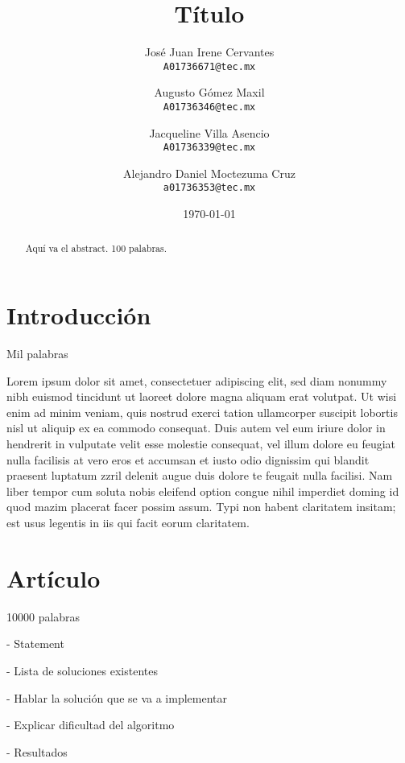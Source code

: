\documentclass[]{article}
\title{Título}
\author{
	José Juan Irene Cervantes \\
	\texttt{A01736671@tec.mx}
	\and
	Augusto Gómez Maxil \\
	\texttt{A01736346@tec.mx}
	\and
	Jacqueline Villa Asencio \\
	\texttt{A01736339@tec.mx}
	\and
	Alejandro Daniel Moctezuma Cruz  \\
	\texttt{a01736353@tec.mx}
}
\date{\today}
\begin{document}
	
	\maketitle
	
	\begin{abstract}
		Aquí va el abstract. 100 palabras.
	\end{abstract}
	
	\begin{multicols}{2}
		
		\section{Introducción}
		
		Mil palabras
		
		Lorem ipsum dolor sit amet, consectetuer adipiscing elit, sed diam nonummy nibh euismod tincidunt ut laoreet dolore magna aliquam erat volutpat. Ut wisi enim ad minim veniam, quis nostrud exerci tation ullamcorper suscipit lobortis nisl ut aliquip ex ea commodo consequat. Duis autem vel eum iriure dolor in hendrerit in vulputate velit esse molestie consequat, vel illum dolore eu feugiat nulla facilisis at vero eros et accumsan et iusto odio dignissim qui blandit praesent luptatum zzril delenit augue duis dolore te feugait nulla facilisi. Nam liber tempor cum soluta nobis eleifend option congue nihil imperdiet doming id quod mazim placerat facer possim assum. Typi non habent claritatem insitam; est usus legentis in iis qui facit eorum claritatem. 
		
		\columnbreak
		
		\section{Artículo}
		10000 palabras
		
		- Statement
		
		- Lista de soluciones existentes
		
		- Hablar la solución que se va a implementar
		
		- Explicar dificultad del algoritmo
		
		- Resultados
		
		
	\end{multicols}
	
\end{document}
